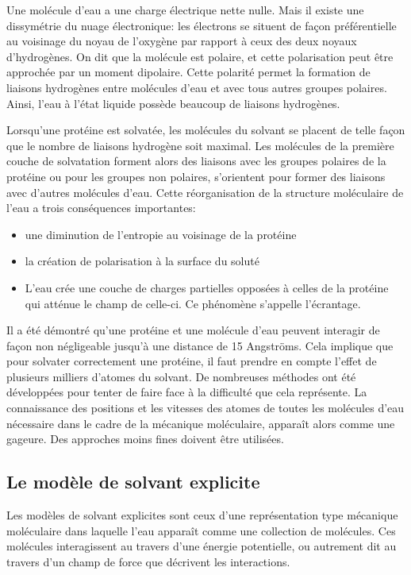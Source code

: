 Une molécule d'eau a une charge électrique nette nulle. Mais il existe une dissymétrie du nuage électronique: les électrons se situent de façon préférentielle au voisinage du noyau de l'oxygène par rapport à ceux des deux noyaux d'hydrogènes.
On dit que la molécule est polaire, et cette polarisation peut être approchée par un moment dipolaire. Cette polarité permet la formation de liaisons hydrogènes entre molécules d'eau et avec tous autres groupes polaires. Ainsi, l'eau à l'état liquide possède beaucoup de liaisons hydrogènes.

Lorsqu'une protéine est solvatée, les molécules du solvant se placent de telle façon que le nombre de liaisons hydrogène soit maximal. Les molécules de la première couche de solvatation forment alors des liaisons avec les groupes polaires de la protéine ou pour les groupes non polaires, s'orientent pour former des liaisons avec d'autres molécules d'eau. Cette réorganisation de la structure moléculaire de l'eau a trois conséquences importantes:

\begin{itemize}
\item une diminution de l'entropie au voisinage de la protéine  
\item la création de polarisation à la surface du soluté
\item  L'eau crée une couche de charges partielles opposées à celles de la protéine qui atténue le champ de celle-ci. Ce phénomène s'appelle l'écrantage.
\end{itemize}
  
Il a été démontré qu'une protéine et une molécule d'eau peuvent interagir de façon non négligeable jusqu'à une distance de 15 Angströms. Cela implique que pour solvater correctement une protéine, il faut prendre en compte l'effet de plusieurs milliers d'atomes du solvant.
De nombreuses méthodes ont été développées pour tenter de faire face à la difficulté que cela représente.
La connaissance des positions et les vitesses des atomes de toutes les molécules d'eau nécessaire dans le cadre de la mécanique moléculaire, apparaît alors comme une gageure. Des approches moins fines doivent être utilisées. 

\subsection{Le modèle de solvant explicite}

Les modèles de solvant explicites sont ceux d'une représentation type mécanique moléculaire dans laquelle l'eau apparaît comme une collection de molécules. Ces molécules interagissent au travers d'une énergie potentielle, ou autrement dit au travers d'un champ de force que décrivent les interactions.


